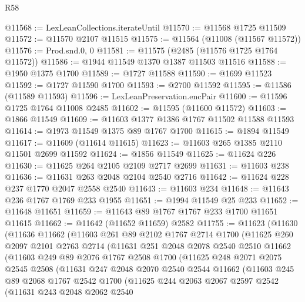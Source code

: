 \begin{lexlean}{R58}
\begin{coremodule}
@11568 := LexLeanCollections.iterateUntil
@11570 := @11568 @1725 @11509
@11572 := @11570 @2107 @11515
@11575 := @11564 (@11008 (@11567 @11572))
@11576 := Prod.snd.{0, 0}
@11581 := @11575 (@2485 (@11576 @1725 @1764 @11572))
@11586 := @1944 @11549 @1370 @1387 @11503 @11516
@11588 := @1950 @1375 @1700
@11589 := @1727 @11588
@11590 := @1699 @11523
@11592 := @1727 @11590 @1700
@11593 := @2700 @11592
@11595 := @11586 (@11589 @11593)
@11596 := LexLeanPreservation.encPair
@11600 := @11596 @1725 @1764 @11008 @2485
@11602 := @11595 (@11600 @11572)
@11603 := @1866 @11549
@11609 := @11603 @1377 @1386 @1767 @11502 @11588 @11593
@11614 := @1973 @11549 @1375 @89 @1767 @1700
@11615 := @1894 @11549
@11617 := @11609 (@11614 @11615)
@11623 := @11603 @265 @1385 @2110 @11501 @2699 @11592
@11624 := @1856 @11549
@11625 := @11624 @226
@11630 := @11625 @264 @2105 @2109 @2717 @2699
@11631 := @11603 @238
@11636 := @11631 @263 @2048 @2104 @2540 @2716
@11642 := @11624 @228 @237 @1770 @2047 @2558 @2540
@11643 := @11603 @234
@11648 := @11643 @236 @1767 @1769 @233 @1955
@11651 := @1994 @11549 @25 @233
@11652 := @11648 @11651
@11659 := @11643 @89 @1767 @1767 @233 @1700 @11651 @11615
@11662 := @11642 (@11652 @11659) @2582
@11755 := @11623
    (@11630
      (@11636
        @11662
        (@11603
          @261
          @89
          @2102
          @1767
          @2714
          @1700
          (@11625
            @260
            @2097
            @2101
            @2763
            @2714
            (@11631
              @251
              @2048
              @2078
              @2540
              @2510
              @11662
              (@11603
                @249
                @89
                @2076
                @1767
                @2508
                @1700
                (@11625
                  @248
                  @2071
                  @2075
                  @2545
                  @2508
                  (@11631
                    @247
                    @2048
                    @2070
                    @2540
                    @2544
                    @11662
                    (@11603
                      @245
                      @89
                      @2068
                      @1767
                      @2542
                      @1700
                      (@11625
                        @244
                        @2063
                        @2067
                        @2597
                        @2542
                        (@11631
                          @243
                          @2048
                          @2062
                          @2540

\end{coremodule}
\end{lexlean}
